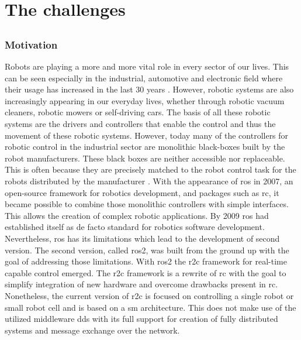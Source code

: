 \part{The challenges}
\chapter{}
\label{sec:Introduction}
\section{Motivation}
Robots are playing a more and more vital role in every sector of our lives. This can be seen especially in the industrial, automotive and electronic field where their usage has increased in the last 30 years \cite{cheng_rise_2019, bilancia_overview_2023}. However, robotic systems are also increasingly appearing in our everyday lives, whether through robotic vacuum cleaners, robotic mowers or self-driving cars. The basis of all these robotic systems are the drivers and controllers that enable the control and thus the movement of these robotic systems. However, today many of the controllers for robotic control in the industrial sector are monolithic black-boxes built by the robot manufacturers. These black boxes are neither accessible nor replaceable. This is often because they are precisely matched to the robot control task for the robots distributed by the manufacturer \cite{puck_distributed_2020, plasberg_towards_2022}. \newline
With the appearance of \gls{ros} in 2007, an open-source framework for robotics development, and packages such as \gls{rc}, it became possible to combine those monolithic controllers with simple interfaces. This allows the creation of complex robotic applications. By 2009 \gls{ros} had established itself as de facto standard for robotics software development. Nevertheless, \gls{ros} has its limitations which lead to the development of second version. The second version, called \gls{ros2}, was built from the ground up with the goal of addressing those limitations. \newline
With \gls{ros2} the \gls{r2c} framework for real-time capable control emerged. The \gls{r2c} framework is a rewrite of \gls{rc} with the goal to simplify integration of new hardware and overcome drawbacks present in \gls{rc}. Nonetheless, the current version of \gls{r2c} is focused on controlling a single robot or small robot cell and is based on a \gls{sm} architecture. This does not make use of the utilized middleware \gls{dds} with its full support for creation of fully distributed systems and message exchange over the network. \newline

